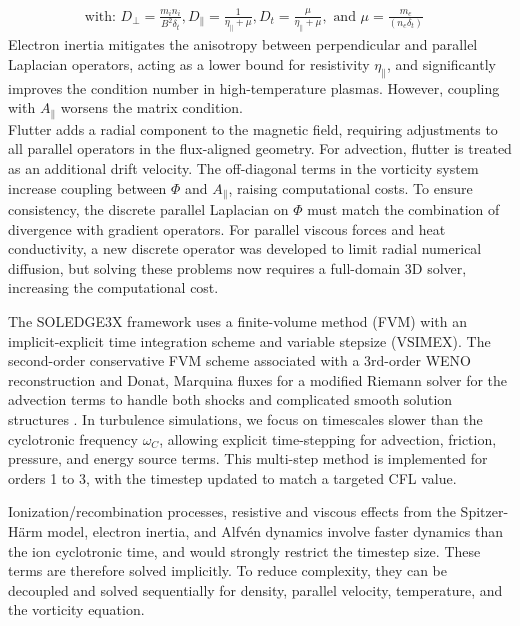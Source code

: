 \begin{chaptersummarybox}
\begin{align*}
		\text{with: } D_\perp = \frac{m_i n_i}{B^2 \delta_t}, D_\parallel = \frac{1}{\eta_\parallel + \mu}, D_t = \frac{\mu}{\eta_\parallel + \mu}, \text{ and } \mu = \frac{m_e}{(n_e \delta_t)} &
	\end{align*}	
	Electron inertia mitigates the anisotropy between perpendicular and parallel Laplacian operators, acting as a lower bound for resistivity $\eta_\parallel$, and significantly improves the condition number in high-temperature plasmas. However, coupling with $A_\parallel$ worsens the matrix condition. \\
	Flutter adds a radial component to the magnetic field, requiring adjustments to all parallel operators in the flux-aligned geometry. For advection, flutter is treated as an additional drift velocity. The off-diagonal terms in the vorticity system increase coupling between $\Phi$ and $A_\parallel$, raising computational costs. To ensure consistency, the discrete parallel Laplacian on $\Phi$ must match the combination of divergence with gradient operators. For parallel viscous forces and heat conductivity, a new discrete operator was developed to limit radial numerical diffusion, but solving these problems now requires a full-domain 3D solver, increasing the computational cost.
\end{chaptersummarybox}

\newpage

The SOLEDGE3X framework uses a finite-volume method (FVM) with an implicit-explicit time integration scheme and variable stepsize (VSIMEX)\cite{wang2008variable}. The second-order conservative FVM scheme associated with a 3rd-order WENO reconstruction and Donat, Marquina fluxes for a modified Riemann solver for the advection terms to handle both shocks and complicated smooth solution structures \cite{tamain2016tokam3x, Bufferand2021}. In turbulence simulations, we focus on timescales slower than the cyclotronic frequency $\omega_C$, allowing explicit time-stepping for advection, friction, pressure, and energy source terms. This multi-step method is implemented for orders 1 to 3, with the timestep updated to match a targeted CFL value.

Ionization/recombination processes, resistive and viscous effects from the Spitzer-Härm model, electron inertia, and Alfvén dynamics involve faster dynamics than the ion cyclotronic time, and would strongly restrict the timestep size. These terms are therefore solved implicitly. To reduce complexity, they can be decoupled and solved sequentially for density, parallel velocity, temperature, and the vorticity equation.

